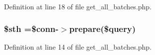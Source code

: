 Definition at line 18 of file get\-\_\-all\-\_\-batches.\-php.

\hypertarget{get__all__batches_8php_afa9126f9664959c02795be300a135f93}{
\subsubsection[{\$sth}]{\setlength{\rightskip}{0pt plus 5cm}\$sth =\$conn-\/$>$prepare(\$query)}}\label{get__all__batches_8php_afa9126f9664959c02795be300a135f93}


Definition at line 14 of file get\-\_\-all\-\_\-batches.\-php.

